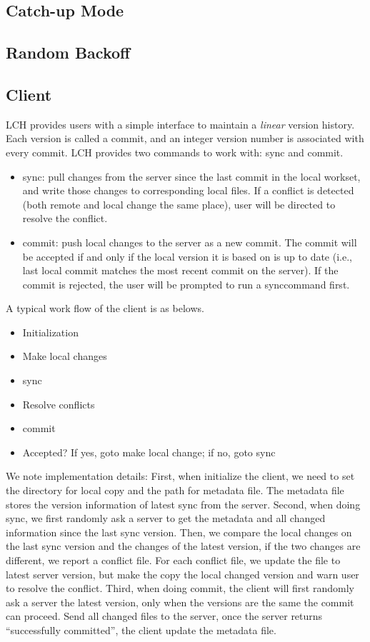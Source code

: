 \documentclass[11pt]{article}
\begin{document}
\subsection{Catch-up Mode}
\subsection{Random Backoff}
\subsection{Client}

LCH provides users with a simple interface to maintain a \emph{linear} version history. Each version is called a commit, and an integer version number is associated with every commit. LCH provides two commands to work with: sync and commit. 
\begin{itemize}
  \item sync: pull changes from the server since the last commit in the local workset, and write those changes to corresponding local files. If a conflict is detected (both remote and local change the same place), user will be directed to resolve the conflict.
  \item commit: push local changes to the server as a new commit. The commit will be accepted if and only if the local version it is based on is up to date (i.e., last local commit matches the most recent commit on the server). If the commit is rejected, the user will be prompted to run a synccommand first.

\end{itemize}
A typical work flow of the client is as belows.
\begin{itemize}
  \item Initialization
  \item Make local changes
  \item sync
  \item Resolve conflicts
  \item commit
  \item Accepted? If yes, goto make local change; if no, goto sync
\end{itemize}

We note implementation details: First, when initialize the client, we need to set the directory for local copy and the path for metadata file. The metadata file stores the version information of latest sync from the server. Second, when doing sync, we first randomly ask a server to get the metadata and all changed information since the last sync version. Then, we compare the local changes on the last sync version and the changes of the latest version, if the two changes are different, we report a conflict file. For each conflict file, we update the file to latest server version, but make the copy the local changed version and warn user to resolve the conflict. Third, when doing commit, the client will first randomly ask a server the latest version, only when the versions are the same the commit can proceed. Send all changed files to the server, once the server returns ``successfully committed'', the client update the metadata file.
\end{document}

